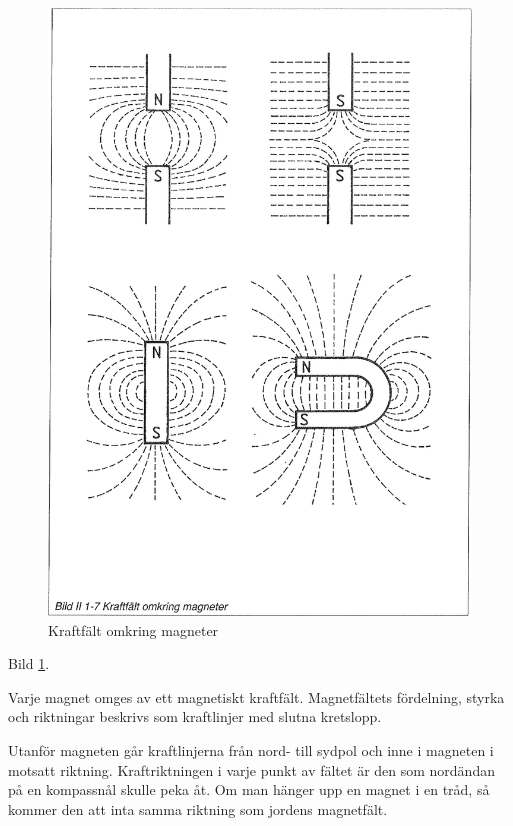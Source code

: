 \begin{figure}
\begin{center}
\includegraphics[width=14cm]{images/bild_2_1-07}
\caption{Kraftfält omkring magneter}
\label{fig:BildII1-7}
\end{center}
\end{figure}

Bild \ref{fig:BildII1-7}.

Varje magnet omges av ett magnetiskt kraftfält. Magnetfältets fördelning, styrka och
riktningar beskrivs som kraftlinjer med slutna kretslopp.

Utanför magneten går kraftlinjerna från nord- till sydpol och inne i magneten i motsatt
riktning. Kraftriktningen i varje punkt av fältet är den som nordändan på en kompassnål
skulle peka åt. Om man hänger upp en magnet i en tråd, så kommer den att inta
samma riktning som jordens magnetfält.

